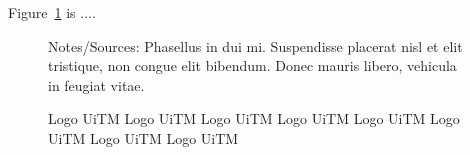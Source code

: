 Figure~\ref{fig:logouitm} is $\dots$. \lipsum[1-2]

\begin{figure}[ht]
    \centering
    \caption[Short version for LoF]{Logo UiTM Logo UiTM Logo UiTM Logo UiTM Logo UiTM Logo UiTM Logo UiTM Logo UiTM}
    \label{fig:logouitm}

    \par\raggedright
    Notes/Sources: Phasellus in dui mi. Suspendisse placerat nisl et elit tristique, non congue elit bibendum. Donec mauris libero, vehicula in feugiat vitae.
\end{figure}

\lipsum[2-3]




